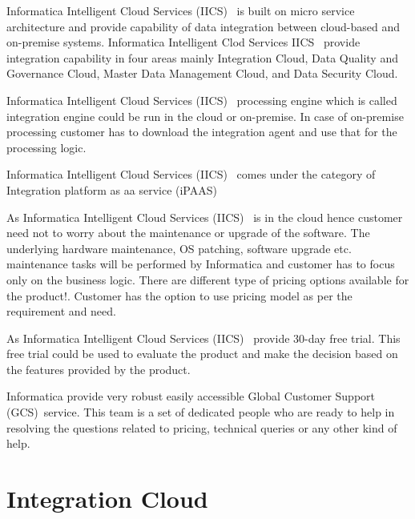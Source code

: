 Informatica Intelligent Cloud Services (IICS)~\cite{hid-sp18-511-iics}
is built on micro service architecture and provide capability of data
integration between cloud-based and on-premise systems. Informatica
Intelligent Clod Services IICS~\cite{hid-sp18-511-iics} provide
integration capability in four areas mainly Integration Cloud, Data
Quality and Governance Cloud, Master Data Management Cloud, and Data
Security Cloud.

Informatica Intelligent Cloud Services (IICS)~\cite{hid-sp18-511-iics}
processing engine which is called integration engine could be run in
the cloud or on-premise. In case of on-premise processing customer has
to download the integration agent and use that for the processing
logic.

Informatica Intelligent Cloud Services (IICS)~\cite{hid-sp18-511-iics}
comes under the category of Integration platform as aa service
(iPAAS)~\cite{hid-sp18-511-ipaas}

As Informatica Intelligent Cloud Services
(IICS)~\cite{hid-sp18-511-iics} is in the cloud hence customer need
not to worry about the maintenance or upgrade of the software. The
underlying hardware maintenance, OS patching, software upgrade
etc. maintenance tasks will be performed by Informatica and customer
has to focus only on the business logic. There are different type of
pricing options available for the
product!\cite{hid-sp18-511-iics-pricing}. Customer has the option to
use pricing model as per the requirement and need.

As Informatica Intelligent Cloud Services
(IICS)~\cite{hid-sp18-511-iics} provide 30-day free trial. This free
trial could be used to evaluate the product and make the decision
based on the features provided by the product.

Informatica provide very robust easily accessible Global Customer
Support (GCS)~\cite{hid-sp18-511-gcs}service. This team is a set of
dedicated people who are ready to help in resolving the questions
related to pricing, technical queries or any other kind of help.

\section{Integration Cloud}

